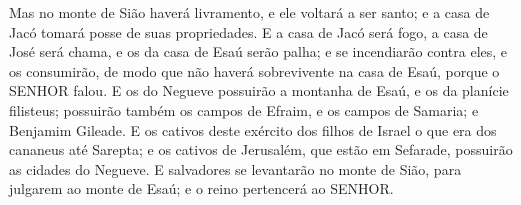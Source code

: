 {Mas no monte de Sião haverá livramento, e ele voltará a ser santo; e a casa de Jacó tomará posse de suas propriedades.
E a casa de Jacó será fogo, a casa de José será chama, e os da casa de Esaú serão palha; e se incendiarão contra eles, e os consumirão, de modo que não haverá sobrevivente na casa de Esaú, porque o SENHOR falou.
E os do Negueve possuirão a montanha de Esaú, e os da planície
{} filisteus; possuirão também os campos de Efraim, e os campos de Samaria; e Benjamim
{} Gileade.
E os cativos deste exército dos filhos de Israel
{} o que era dos cananeus até Sarepta;
 e os cativos de Jerusalém, que estão em Sefarade, possuirão as cidades do Negueve.
E salvadores se levantarão no monte de Sião, para julgarem ao monte de Esaú; e o reino pertencerá ao SENHOR.\par }